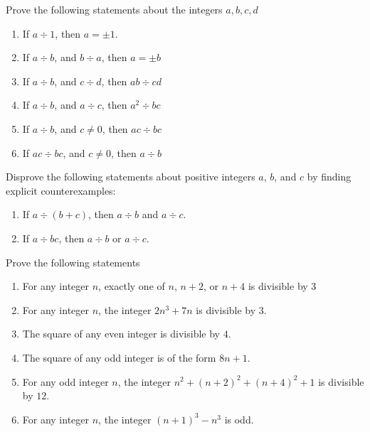 \begin{exercise}
  Prove the following statements about the integers $a, b, c, d$

  \begin{enumerate}[label=(\alph*)]
  \item If $a \div 1$, then $a = \pm 1$.
  \item If $a \div b$, and $b \div a$, then $a = \pm b$
  \item If $a \div b$, and $c \div d$, then $ab \div cd$
  \item If $a \div b$, and $a \div c$, then $a^2 \div bc$
  \item If $a \div b$, and $c \ne 0$, then $ac \div bc$
  \item If $ac \div bc$, and $c \ne 0$, then $a \div b$
  \end{enumerate}
\end{exercise}

\begin{exercise}
  Disprove the following statements about positive integers $a$, $b$,
  and $c$ by finding explicit counterexamples:

  \begin{enumerate}[label=(\alph*)]
  \item If $a \div (b + c)$, then $a \div b$ and $a \div c$.
  \item If $a \div bc$, then $a \div b$ or $a \div c$.
  \end{enumerate}
\end{exercise}

\begin{exercise}
  Prove the following statements

  \begin{enumerate}[label=(\alph*)]
  \item For any integer $n$, exactly one of $n$, $n + 2$, or $n + 4$
    is divisible by $3$
  \item For any integer $n$, the integer $2n^3 + 7n$ is divisible by
    $3$.
  \item The square of any even integer is divisible by $4$.
  \item The square of any odd integer is of the form $8n + 1$.
  \item For any odd integer $n$, the integer
    $n^2 + (n + 2)^2 + (n + 4)^2 + 1$ is divisible by $12$.
  \item For any integer $n$, the integer $(n + 1)^3 - n^3$ is odd.
  \end{enumerate}
\end{exercise}


